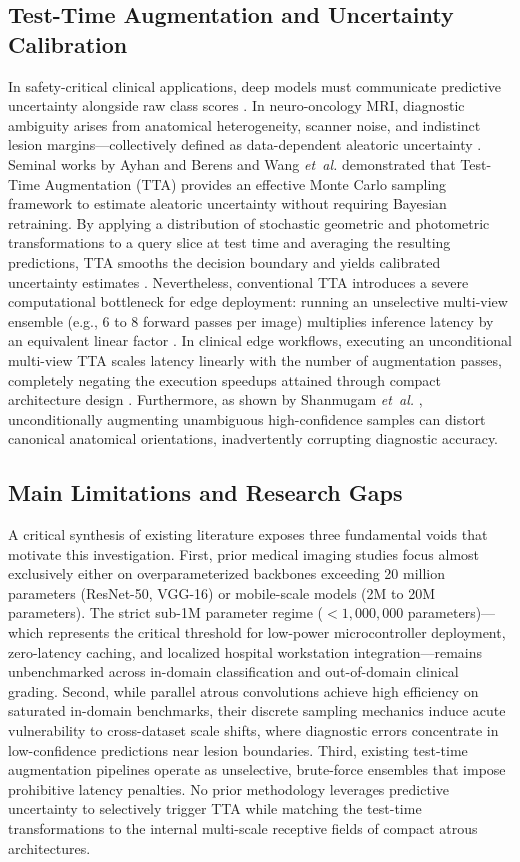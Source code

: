 ﻿\documentclass[journal]{IEEEtran}
\begin{document}
\subsection{Test-Time Augmentation and Uncertainty Calibration}
In safety-critical clinical applications, deep models must communicate predictive uncertainty alongside raw class scores \cite{10, 57}. In neuro-oncology MRI, diagnostic ambiguity arises from anatomical heterogeneity, scanner noise, and indistinct lesion margins---collectively defined as data-dependent aleatoric uncertainty \cite{4, 47}. Seminal works by Ayhan and Berens \cite{4} and Wang \emph{et~al.} \cite{47} demonstrated that Test-Time Augmentation (TTA) provides an effective Monte Carlo sampling framework to estimate aleatoric uncertainty without requiring Bayesian retraining. By applying a distribution of stochastic geometric and photometric transformations to a query slice at test time and averaging the resulting predictions, TTA smooths the decision boundary and yields calibrated uncertainty estimates \cite{4, 47, 58}. Nevertheless, conventional TTA introduces a severe computational bottleneck for edge deployment: running an unselective multi-view ensemble (e.g., 6 to 8 forward passes per image) multiplies inference latency by an equivalent linear factor \cite{58}. In clinical edge workflows, executing an unconditional multi-view TTA scales latency linearly with the number of augmentation passes, completely negating the execution speedups attained through compact architecture design \cite{47, 58}. Furthermore, as shown by Shanmugam \emph{et~al.} \cite{58}, unconditionally augmenting unambiguous high-confidence samples can distort canonical anatomical orientations, inadvertently corrupting diagnostic accuracy.

\subsection{Main Limitations and Research Gaps}
A critical synthesis of existing literature exposes three fundamental voids that motivate this investigation. First, prior medical imaging studies focus almost exclusively either on overparameterized backbones exceeding 20 million parameters (ResNet-50, VGG-16) or mobile-scale models (2M to 20M parameters). The strict sub-1M parameter regime ($<1,000,000$ parameters)---which represents the critical threshold for low-power microcontroller deployment, zero-latency caching, and localized hospital workstation integration---remains unbenchmarked across in-domain classification and out-of-domain clinical grading. Second, while parallel atrous convolutions achieve high efficiency on saturated in-domain benchmarks, their discrete sampling mechanics induce acute vulnerability to cross-dataset scale shifts, where diagnostic errors concentrate in low-confidence predictions near lesion boundaries. Third, existing test-time augmentation pipelines operate as unselective, brute-force ensembles that impose prohibitive latency penalties. No prior methodology leverages predictive uncertainty to selectively trigger TTA while matching the test-time transformations to the internal multi-scale receptive fields of compact atrous architectures.
\end{document}
